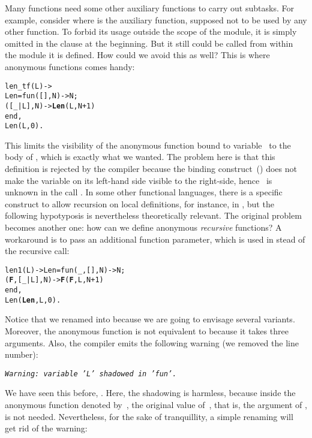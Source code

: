 Many functions need some other auxiliary functions to carry out
subtasks. For example, consider
 where  is the auxiliary
function, supposed not to be used by any other function. To forbid its
usage outside the scope of the module, it is simply omitted in the
 clause at the beginning. But it still could be
called from within the module it is defined. How could we avoid this
as well? This is where anonymous functions comes handy:
\begin{alltt}
len_tf(L) -> 
  Len = fun(   [],N) -> N;
           ([_|L],N) -> \textbf{Len}(L,N+1)\hfill% \emph{Does not compile}
        end,
  Len(L,0).
\end{alltt}
This limits the visibility of the anonymous function bound to
variable~ to the body of , which is
exactly what we wanted. The problem here is that this definition is
rejected by the \Erlang compiler because the binding
construct~(\erlcode{=}) does not make the variable on its
left\hyp{}hand side visible to the right\hyp{}side, hence
~is unknown in the call . In some
other functional languages, there is a specific construct to allow
recursion on local definitions, for instance,  in
\OCaml, but the following hypotyposis is nevertheless theoretically
relevant. The original problem becomes another one: how can we define
anonymous \emph{recursive} functions? A workaround is to pass an
additional function parameter, which is used in stead of the recursive
call:
\begin{alltt}
len1(L) -> Len = fun(_,   [],N) -> N;
                    (\textbf{F},[_|L],N) -> \textbf{F}(\textbf{F},L,N+1)
                 end,
           Len(\textbf{Len},L,0).
\end{alltt}
Notice that we renamed  into 
because we are going to envisage several variants. Moreover, the
anonymous function is not equivalent to  because it
takes three arguments. Also, the compiler emits the following warning
(we removed the line number):
\begin{center}
\emph{\texttt{Warning: variable 'L' shadowed in 'fun'.}}
\end{center}
We have seen this before, . Here, the shadowing is
harmless, because inside the anonymous function denoted
by~, the original value of~, that is, the
argument of , is not needed. Nevertheless, for the
sake of tranquillity, a simple renaming will get rid of the warning:
